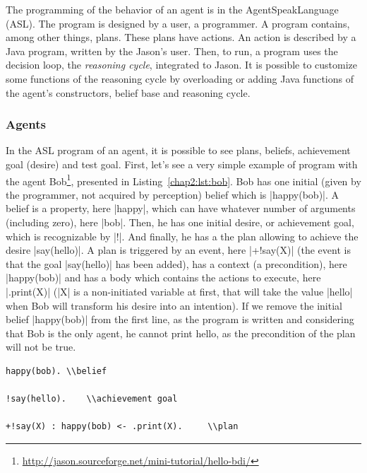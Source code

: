 \documentclass[a4paper,11pt,twoside]{StyleThese}
\begin{document}
The programming of the behavior of an agent is in the AgentSpeakLanguage (ASL). The program is designed by a user, a programmer. A program contains, among other things, plans. These plans have actions. An action is described by a Java program, written by the Jason's user. Then, to run, a program uses the decision loop, the \textit{reasoning cycle}, integrated to Jason. It is possible to customize some functions of the reasoning cycle by overloading or adding Java functions of the agent's constructors, belief base and reasoning cycle. 

\subsubsection{Agents} In the ASL program of an agent, it is possible to see plans, beliefs, achievement goal (desire) and test goal. First, let's see a very simple example of program with the agent Bob\footnote{\url{http://jason.sourceforge.net/mini-tutorial/hello-bdi/}}, presented in Listing~\ref{chap2:lst:bob}. Bob has one initial (\ie given by the programmer, not acquired by perception) belief which is |happy(bob)|. A belief is a property, here |happy|, which can have whatever number of arguments (including zero), here |bob|. Then, he has one initial desire, or achievement goal, which is recognizable by |!|. And finally, he has a the plan allowing to achieve the desire |say(hello)|. A plan is triggered by an event, here |+!say(X)| (\ie the event is that the goal |say(hello)| has been added), has a context (\ie a precondition), here |happy(bob)| and has a body which contains the actions to execute, here |.print(X)| (\ie |X| is a non-initiated variable at first, that will take the value |hello| when Bob will transform his desire into an intention). If we remove the initial belief |happy(bob)| from the first line, as the program is written and considering that Bob is the only agent, he cannot print hello, as the precondition of the plan will not be true.

\begin{lstlisting}[caption={ASL program of Bob, a Jason agent}, label={chap2:lst:bob}]
happy(bob).	\\belief

!say(hello).	\\achievement goal

+!say(X) : happy(bob) <- .print(X).		\\plan
\end{lstlisting} 
\end{document}
